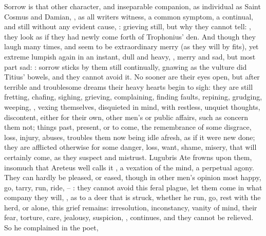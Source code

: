 {Sorrow is that other character, and inseparable companion, as individual as
Saint Cosmus and Damian, , as all writers witness, a common
symptom, a continual, and still without any evident cause,
: grieving still, but why they cannot tell: , they look as if they had newly come forth of Trophonius' den. And
though they laugh many times, and seem to be extraordinary merry (as they will
by fits), yet extreme lumpish again in an instant, dull and heavy, , merry and sad, but most part sad: : sorrow sticks by them still
continually, gnawing as the vulture did Titius' bowels,
and they cannot avoid it. No sooner are their eyes open, but after terrible and
troublesome dreams their heavy hearts begin to sigh: they are still fretting,
chafing, sighing, grieving, complaining, finding faults, repining, grudging,
weeping, , vexing themselves,
disquieted in mind, with restless, unquiet thoughts,
discontent, either for their own, other men's or public affairs, such as
concern them not; things past, present, or to come, the remembrance of some
disgrace, loss, injury, abuses, \etc{} troubles them now being idle afresh, as
if it were new done; they are afflicted otherwise for some danger, loss, want,
shame, misery, that will certainly come, as they suspect and mistrust. Lugubris
Ate frowns upon them, insomuch that Areteus well calls it , a
vexation of the mind, a perpetual agony. They can hardly be pleased, or eased,
though in other men's opinion most happy, go, tarry, run, ride,
-- : they cannot avoid
this feral plague, let them come in what company they will,
, as to a deer that is
struck, whether he run, go, rest with the herd, or alone, this grief remains:
irresolution, inconstancy, vanity of mind, their fear, torture, care, jealousy,
suspicion, \etc{}, continues, and they cannot be relieved. So
he complained in the poet,

}
